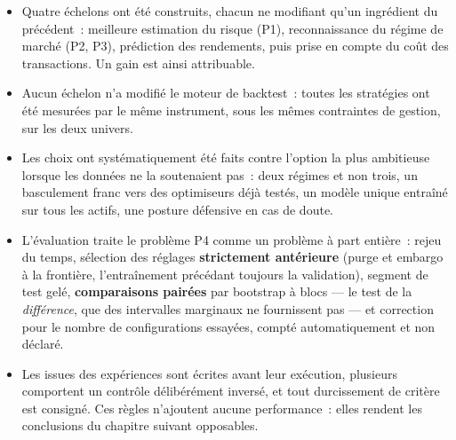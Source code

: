 \begin{itemize}
  \item Quatre échelons ont été construits, chacun ne modifiant qu'un ingrédient
        du précédent~: meilleure estimation du risque (P1), reconnaissance du
        régime de marché (P2, P3), prédiction des rendements, puis prise en
        compte du coût des transactions. Un gain est ainsi attribuable.
  \item Aucun échelon n'a modifié le moteur de backtest~: toutes les stratégies
        ont été mesurées par le même instrument, sous les mêmes contraintes de
        gestion, sur les deux univers.
  \item Les choix ont systématiquement été faits contre l'option la plus
        ambitieuse lorsque les données ne la soutenaient pas~: deux régimes et
        non trois, un basculement franc vers des optimiseurs déjà testés, un
        modèle unique entraîné sur tous les actifs, une posture défensive en cas
        de doute.
  \item L'évaluation traite le problème P4 comme un problème à part entière~:
        rejeu du temps, sélection des réglages \textbf{strictement antérieure}
        (purge et embargo à la frontière, l'entraînement précédant toujours la
        validation), segment de test gelé, \textbf{comparaisons pairées} par
        bootstrap à blocs — le test de la \emph{différence}, que des intervalles
        marginaux ne fournissent pas — et correction pour le nombre de
        configurations essayées, compté automatiquement et non déclaré.
  \item Les issues des expériences sont écrites avant leur exécution, plusieurs
        comportent un contrôle délibérément inversé, et tout durcissement de
        critère est consigné. Ces règles n'ajoutent aucune performance~: elles
        rendent les conclusions du chapitre suivant opposables.
\end{itemize}
